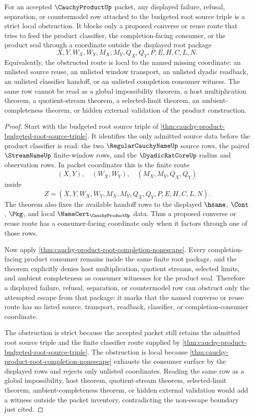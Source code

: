 \begin{corollary}
\label{cor:cauchy-product-budgeted-root-source-strict-obstruction}
For an accepted $\CauchyProductUp$ packet, any displayed failure, refusal, separation, or countermodel row attached to the budgeted root source triple is a strict local obstruction. It blocks only a proposed converse or reuse route that tries to feed the product classifier, the completion-facing consumer, or the product seal through a coordinate outside the displayed root package
$$
X,Y,W_X,W_Y,M_X,M_Y,Q_X,Q_Y,P,E,H,C,L,N .
$$
Equivalently, the obstructed route is local to the named missing coordinate: an unlisted source reuse, an unlisted window transport, an unlisted dyadic readback, an unlisted classifier handoff, or an unlisted completion consumer witness. The same row cannot be read as a global impossibility theorem, a host multiplication theorem, a quotient-stream theorem, a selected-limit theorem, an ambient-completeness theorem, or hidden external validation of the product construction.
\end{corollary}
\begin{proof}
Start with the budgeted root source triple of \autoref{thm:cauchy-product-budgeted-root-source-triple}. It identifies the only admitted source data before the product classifier is read: the two $\RegularCauchyNameUp$ source rows, the paired $\StreamNameUp$ finite-window rows, and the $\DyadicRatCoreUp$ radius and observation rows. In packet coordinates this is the finite route
$$
(X,Y),\quad (W_X,W_Y),\quad (M_X,M_Y,Q_X,Q_Y)
$$
inside
$$
Z=(X,Y,W_X,W_Y,M_X,M_Y,Q_X,Q_Y,P,E,H,C,L,N).
$$
The theorem also fixes the available handoff rows to the displayed $\hsame$, $\Cont$, $\Pkg$, and local $\NameCert_{\CauchyProductUp}$ data. Thus a proposed converse or reuse route has a consumer-facing coordinate only when it factors through one of those rows.

Now apply \autoref{thm:cauchy-product-root-completion-nonescape}. Every completion-facing product consumer remains inside the same finite root package, and the theorem explicitly denies host multiplication, quotient streams, selected limits, and ambient completeness as consumer witnesses for the product seal. Therefore a displayed failure, refusal, separation, or countermodel row can obstruct only the attempted escape from that package: it marks that the named converse or reuse route has no listed source, transport, readback, classifier, or completion-consumer coordinate.

The obstruction is strict because the accepted packet still retains the admitted root source triple and the finite classifier route supplied by \autoref{thm:cauchy-product-budgeted-root-source-triple}. The obstruction is local because \autoref{thm:cauchy-product-root-completion-nonescape} exhausts the consumer surface by the displayed rows and rejects only unlisted coordinates. Reading the same row as a global impossibility, host theorem, quotient-stream theorem, selected-limit theorem, ambient-completeness theorem, or hidden external validation would add a witness outside the packet inventory, contradicting the non-escape boundary just cited.
\end{proof}
